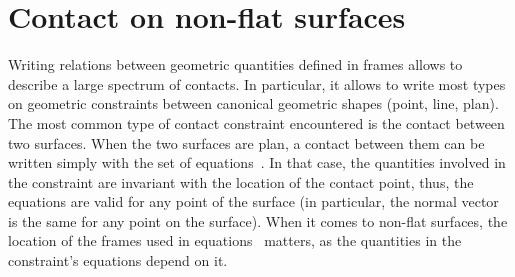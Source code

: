 
\section{Contact on non-flat surfaces}
\label{sec:contact_on_non_flat_surfaces}

Writing relations between geometric quantities defined in frames allows to describe a large spectrum of contacts.
In particular, it allows to write most types on geometric constraints between canonical geometric shapes (point, line, plan).
The most common type of contact constraint encountered is the contact between two surfaces.
When the two surfaces are plan, a contact between them can be written simply with the set of equations~.
In that case, the quantities involved in the constraint are invariant with the location of the contact point, thus, the equations are valid for any point of the surface (in particular, the normal vector is the same for any point on the surface).
When it comes to non-flat surfaces, the location of the frames used in equations~ matters, as the quantities in the constraint's equations depend on it.



